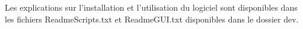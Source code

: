 Les explications sur l'installation et l'utilisation du logiciel sont disponibles dans les fichiers ReadmeScripts.txt et ReadmeGUI.txt disponibles dans le dossier dev.

